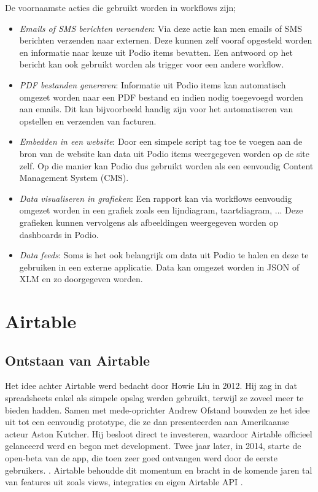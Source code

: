 De voornaamste acties die gebruikt worden in workflows zijn;
\begin{itemize}
    \item \textit{Emails of SMS berichten verzenden}: Via deze actie kan men emails of SMS berichten verzenden naar externen. Deze kunnen zelf vooraf opgesteld worden en informatie naar keuze uit Podio items bevatten. Een antwoord op het bericht kan ook gebruikt worden als trigger voor een andere workflow. \autocite{PodioWorkflowFeatures}
    \item \textit{PDF bestanden genereren}: Informatie uit Podio items kan automatisch omgezet worden naar een PDF bestand en indien nodig toegevoegd worden aan emails. Dit kan bijvoorbeeld handig zijn voor het automatiseren van opstellen en verzenden van facturen. \autocite{PodioWorkflowFeatures}
    \item \textit{Embedden in een website}: Door een simpele script tag toe te voegen aan de bron van de website kan data uit Podio items weergegeven worden op de site zelf. Op die manier kan Podio dus gebruikt worden als een eenvoudig Content Management System (CMS). \autocite{PodioWorkflowFeatures}
    \item \textit{Data visualiseren in grafieken}: Een rapport kan via workflows eenvoudig omgezet worden in een grafiek zoals een lijndiagram, taartdiagram, ... Deze grafieken kunnen vervolgens als afbeeldingen weergegeven worden op dashboards in Podio. \autocite{PodioWorkflowFeatures}
    \item \textit{Data feeds}: Soms is het ook belangrijk om data uit Podio te halen en deze te gebruiken in een externe applicatie. Data kan omgezet worden in JSON of XLM en zo doorgegeven worden. \autocite{PodioWorkflowFeatures}
\end{itemize}

\section{Airtable}


\subsection{Ontstaan van Airtable}


Het idee achter Airtable werd bedacht door Howie Liu in 2012. Hij zag in dat spreadsheets enkel als simpele opslag werden gebruikt, terwijl ze zoveel meer te bieden hadden. Samen met mede-oprichter Andrew Ofstand bouwden ze het idee uit tot een eenvoudig prototype, die ze dan presenteerden aan Amerikaanse acteur Aston Kutcher. Hij besloot direct te investeren, waardoor Airtable officieel gelanceerd werd en begon met development. Twee jaar later, in 2014, starte de open-beta van de app, die toen zeer goed ontvangen werd door de eerste gebruikers. \autocite{Black2019}.
Airtable behoudde dit momentum en bracht in de komende jaren tal van features uit zoals views, integraties en eigen Airtable API \autocite{Shah}. \\

